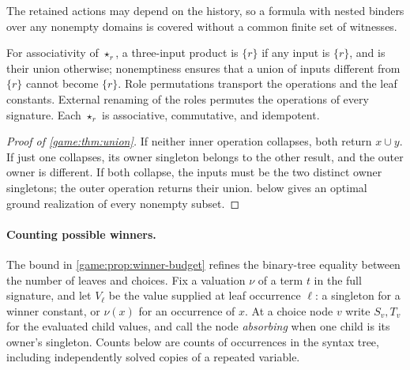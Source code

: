 The retained actions may depend on the history, so a formula with nested
binders over any nonempty domains is covered without a common finite set of
witnesses.

For associativity of $\star_r$, a three-input product is $\{r\}$ if any input is $\{r\}$, and is their union otherwise; nonemptiness ensures that a union of inputs different from $\{r\}$ cannot become $\{r\}$. Role permutations transport the
operations and the leaf constants. External renaming of the roles permutes the operations of every signature. Each $\star_r$ is associative, commutative, and idempotent. 
\begin{proof}[Proof of \cref{game:thm:union}]
If neither inner operation collapses, both return $x\cup y$. If just one
collapses, its owner singleton belongs to the other result, and the outer
owner is different. If both collapse, the inputs must be the two distinct
owner singletons; the outer operation returns their union.
 below gives an optimal ground realization
of every nonempty subset.
\end{proof}

\paragraph{Counting possible winners.}
The bound in \cref{game:prop:winner-budget} refines the binary-tree
equality between the number of leaves and choices. Fix a valuation $\nu$ of a term $t$ in the
full signature, and let $V_\ell$ be the value supplied at leaf
occurrence $\ell$: a singleton for a winner constant, or $\nu(x)$
for an occurrence of $x$. At a choice node $v$ write $S_v,T_v$ for
the evaluated child values, and call the node \emph{absorbing} when
one child is its owner's singleton. Counts below are counts of
occurrences in the syntax tree, including independently solved copies
of a repeated variable.

